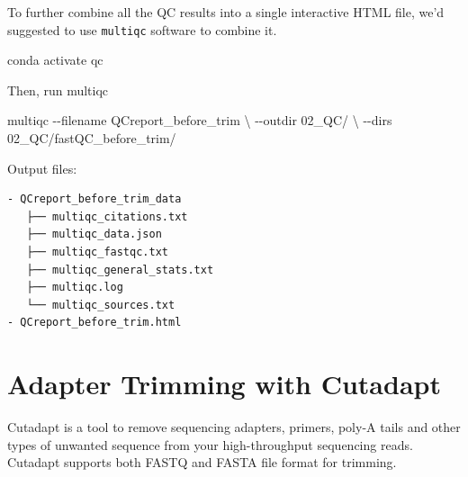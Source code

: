 \documentclass[
  letterpaper,
  DIV=11,
  numbers=noendperiod]{scrreprt}
\newenvironment{Shaded}{\begin{snugshade}}{\end{snugshade}}
\newcommand{\AttributeTok}[1]{\textcolor[rgb]{0.40,0.45,0.13}{#1}}
\newcommand{\DataTypeTok}[1]{\textcolor[rgb]{0.68,0.00,0.00}{#1}}
\newcommand{\ExtensionTok}[1]{\textcolor[rgb]{0.00,0.23,0.31}{#1}}
\newcommand{\NormalTok}[1]{\textcolor[rgb]{0.00,0.23,0.31}{#1}}
\begin{document}
\begin{tcolorbox}[enhanced jigsaw, breakable, bottomrule=.15mm, left=2mm, coltitle=black, opacityback=0, colframe=quarto-callout-note-color-frame, toprule=.15mm, opacitybacktitle=0.6, colbacktitle=quarto-callout-note-color!10!white, bottomtitle=1mm, colback=white, toptitle=1mm, titlerule=0mm, rightrule=.15mm, arc=.35mm, title=\textcolor{quarto-callout-note-color}{\faInfo}\hspace{0.5em}{Activity}, leftrule=.75mm]

To further combine all the QC results into a single interactive HTML
file, we'd suggested to use \texttt{multiqc} software to combine it.

\begin{Shaded}
\begin{Highlighting}[]
\ExtensionTok{conda}\NormalTok{ activate qc}
\end{Highlighting}
\end{Shaded}

Then, run multiqc

\begin{Shaded}
\begin{Highlighting}[]
\ExtensionTok{multiqc} \AttributeTok{{-}{-}filename}\NormalTok{ QCreport\_before\_trim }\DataTypeTok{\textbackslash{}}
\NormalTok{{-}{-}outdir 02\_QC/ }\DataTypeTok{\textbackslash{}}
\NormalTok{{-}{-}dirs 02\_QC/fastQC\_before\_trim/}
\end{Highlighting}
\end{Shaded}

Output files:

\begin{verbatim}
- QCreport_before_trim_data
   ├── multiqc_citations.txt
   ├── multiqc_data.json
   ├── multiqc_fastqc.txt
   ├── multiqc_general_stats.txt
   ├── multiqc.log
   └── multiqc_sources.txt
- QCreport_before_trim.html
\end{verbatim}

\end{tcolorbox}

\hypertarget{adapter-trimming-with-cutadapt}{%
\section{Adapter Trimming with
Cutadapt}\label{adapter-trimming-with-cutadapt}}

Cutadapt is a tool to remove sequencing adapters, primers, poly-A tails
and other types of unwanted sequence from your high-throughput
sequencing reads. Cutadapt supports both FASTQ and FASTA file format for
trimming.
\end{document}
